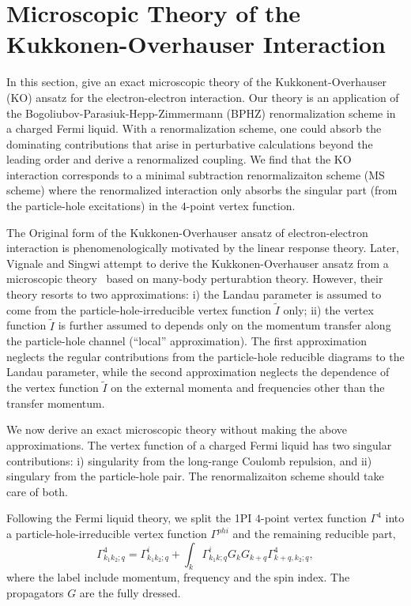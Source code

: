 \documentclass[reprint,amsmath,amssymb,aps,prb]{revtex4-1}
\begin{document}
\section{Microscopic Theory of the Kukkonen-Overhauser Interaction}

In this section, give an exact microscopic theory of the Kukkonent-Overhauser (KO) ansatz for the electron-electron interaction.
Our theory is an application of the Bogoliubov-Parasiuk-Hepp-Zimmermann (BPHZ) renormalization scheme in a charged Fermi liquid.
With a renormalization scheme, one could absorb the dominating contributions that arise in perturbative calculations beyond the leading order
and derive a renormalized coupling.
We find that the KO interaction corresponds to a minimal subtraction renormalizaiton scheme (MS scheme) where the renormalized interaction only absorbs the
singular part (from the particle-hole excitations) in the $4$-point vertex function.

The Original form of the Kukkonen-Overhauser ansatz of electron-electron interaction is phenomenologically motivated by the linear response theory\cite{kukkonen}.
Later, Vignale and Singwi attempt to derive the Kukkonen-Overhauser ansatz from a microscopic theory~\cite{vignale1} based on many-body perturabtion theory.
However, their theory resorts to two approximations: i) the Landau parameter is assumed to come from the particle-hole-irreducible vertex function $\tilde{I}$ only;
ii) the vertex function $\tilde{I}$ is further assumed to depends only on the momentum transfer along the particle-hole channel (``local'' approximation).
The first approximation neglects the regular contributions from the particle-hole reducible diagrams to the Landau parameter, while the second
approximation neglects the dependence of the vertex function $\tilde{I}$ on the external momenta and frequencies other than the transfer momentum.

We now derive an exact microscopic theory without making the above approximations.
The vertex function of a charged Fermi liquid has two singular contributions: i) singularity from the long-range Coulomb repulsion, and
ii) singulary from the particle-hole pair. The renormalizaiton scheme should take care of both.

Following the Fermi liquid theory,
we split the 1PI $4$-point vertex function $\Gamma^4$ into a particle-hole-irreducible vertex function $\Gamma^{phi}$
and the remaining reducible part,
\begin{equation}
    \label{eq:particle-hole-sc}
    \Gamma^4_{k_1k_2;q}=\Gamma^{i}_{k_1k_2;q}+\int_{k}\Gamma^{i}_{k_1k;q}G_{k}G_{k+q}\Gamma^4_{k+q,k_2;q},
\end{equation}
where the label include momentum, frequency and the spin index. The propagators $G$ are the fully dressed.
\end{document}
